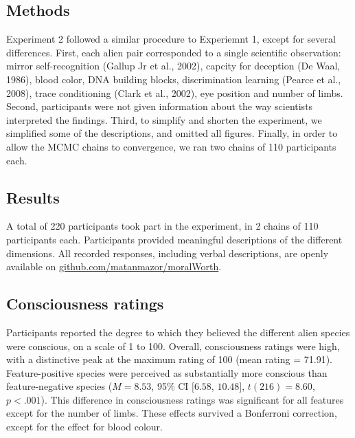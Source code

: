 \documentclass[10pt, letterpaper]{article}
\begin{document}
\hypertarget{methods-1}{%
\subsection{Methods}\label{methods-1}}

Experiment 2 followed a similar procedure to Experiemnt 1, except for
several differences. First, each alien pair corresponded to a single
scientific observation: mirror self-recognition (Gallup Jr et al.,
2002), capcity for deception (De Waal, 1986), blood color, DNA building
blocks, discrimination learning (Pearce et al., 2008), trace
conditioning (Clark et al., 2002), eye position and number of limbs.
Second, participants were not given information about the way scientists
interpreted the findings. Third, to simplify and shorten the experiment,
we simplified some of the descriptions, and omitted all figures.
Finally, in order to allow the MCMC chains to convergence, we ran two
chains of 110 participants each.

\hypertarget{results-1}{%
\subsection{Results}\label{results-1}}

A total of 220 participants took part in the experiment, in 2 chains of
110 participants each. Participants provided meaningful descriptions of
the different dimensions. All recorded responses, including verbal
descriptions, are openly available on
\url{github.com/matanmazor/moralWorth}.

\hypertarget{consciousness-ratings-1}{%
\subsection{Consciousness ratings}\label{consciousness-ratings-1}}

Participants reported the degree to which they believed the different
alien species were conscious, on a scale of 1 to 100. Overall,
consciousness ratings were high, with a distinctive peak at the maximum
rating of 100 (mean rating = 71.91). Feature-positive species were
perceived as substantially more conscious than feature-negative species
(\(M = 8.53\), 95\% CI \([6.58\), \(10.48]\), \(t(216) = 8.60\),
\(p < .001\)). This difference in consciousness ratings was significant
for all features except for the number of limbs. These effects survived
a Bonferroni correction, except for the effect for blood colour.
\end{document}
